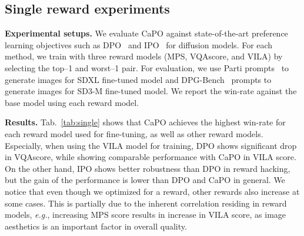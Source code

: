 \subsection{Single reward experiments}
\label{sec:single_exp}
\vspace{1mm}
\noindent
{\bf Experimental setups.} We evaluate CaPO against state-of-the-art preference learning objectives such as DPO~\citep{wallace2023diffusion} and IPO~\citep{azar2024general} for diffusion models.
For each method, we train with three reward models (MPS, VQAscore, and VILA) by selecting the top--1 and worst--1 pair.
For evaluation, we use Parti prompts~\citep{yu2022scaling} to generate images for SDXL fine-tuned model and DPG-Bench~\citep{hu2024ella} prompts to generate images for SD3-M fine-tuned model.
We report the win-rate against the base model using each reward model.

\vspace{0.05in}
\noindent
{\bf Results.} Tab.~\ref{tab:single} shows that CaPO achieves the highest win-rate for each reward model used for fine-tuning, as well as other reward models. 
Especially, when using the VILA model for training, DPO shows significant drop in VQAscore, while showing comparable performance with CaPO in VILA score.
On the other hand, IPO shows better robustness than DPO in reward hacking, but the gain of the performance is lower than DPO and CaPO in general. 
We notice that even though we optimized for a reward, other rewards also increase at some cases. 
This is partially due to the inherent correlation residing in reward models, \emph{e.g.}, increasing MPS score results in increase in VILA score, as image aesthetics is an important factor in overall quality. 





